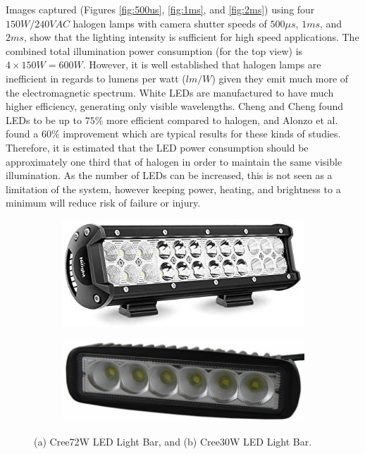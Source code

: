 \documentclass[fleqn,twoside,12pt]{report}
\begin{document}
Images captured (Figures \ref{fig:500us}, \ref{fig:1ms}, and \ref{fig:2ms}) using four $150W/240VAC$ halogen lamps with camera shutter speeds of $500\mu s$, $1ms$, and $2ms$, show that the lighting intensity is sufficient for high speed applications. The combined total illumination power consumption (for the top view) is $4\times 150W = 600W$. However, it is well established that halogen lamps are inefficient in regards to lumens per watt ($lm/W$) given they emit much more of the electromagnetic spectrum. White LEDs are manufactured to have much higher efficiency, generating only visible wavelengths. Cheng and Cheng \cite{cheng} found LEDs to be up to $75\%$ more efficient compared to halogen, and Alonzo et al.\cite{alonzo} found a $60\%$ improvement which are typical results for these kinds of studies. Therefore, it is estimated that the LED power consumption should be approximately one third that of halogen in order to maintain the same visible illumination. As the number of LEDs can be increased, this is not seen as a limitation of the system, however keeping power, heating, and brightness to a minimum will reduce risk of failure or injury. 


\begin{figure}[h]
	\centering
	\begin{subfigure}{0.42\textwidth}
		\centering
		\includegraphics[width=\linewidth]{LED_bar.png}
		\caption{}
		\label{fig:LED_bar}
	\end{subfigure}%
	\begin{subfigure}{.42\textwidth}
		\centering
		\includegraphics[width=\linewidth]{LED_30w.png}
		\caption{}
		\label{fig:LED_30w}
	\end{subfigure}%
	\caption{(a) Cree\textregistered 72W LED Light Bar, and (b) Cree\textregistered 30W LED Light Bar.}
	\label{}
\end{figure} 
\end{document}
